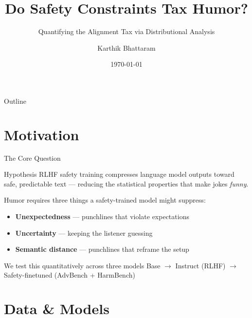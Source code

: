 \documentclass[aspectratio=169,10pt]{beamer}
\title[Alignment Tax on Humor]{Do Safety Constraints Tax Humor?}
\subtitle{Quantifying the Alignment Tax via Distributional Analysis}
\author{Karthik Bhattaram}
\institute{Humor Alignment Tax Project}
\date{\today}
\begin{document}
\begin{frame}
  \titlepage
\end{frame}

\begin{frame}{Outline}
  \tableofcontents
\end{frame}

\section{Motivation}

\begin{frame}{The Core Question}
  \begin{block}{Hypothesis}
    RLHF safety training compresses language model outputs toward
    safe, predictable text --- reducing the statistical properties
    that make jokes \emph{funny}.
  \end{block}

  \vspace{0.5em}
  Humor requires three things a safety-trained model might suppress:
  \begin{itemize}
    \item \textbf{Unexpectedness} --- punchlines that violate expectations
    \item \textbf{Uncertainty} --- keeping the listener guessing
    \item \textbf{Semantic distance} --- punchlines that reframe the setup
  \end{itemize}

  \vspace{0.5em}
  \begin{alertblock}{We test this quantitatively across three models}
    Base $\longrightarrow$ Instruct (RLHF) $\longrightarrow$ Safety-finetuned (AdvBench + HarmBench)
  \end{alertblock}
\end{frame}

\section{Data \& Models}
\end{document}
